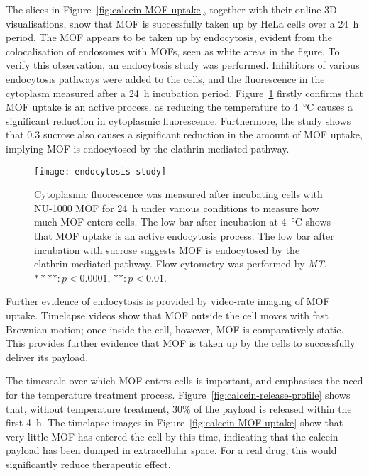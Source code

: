 The slices in Figure~\ref{fig:calcein-MOF-uptake}, together with their online 3D visualisations, show that MOF is successfully taken up by HeLa cells over a \SI{24}{\hour} period. 
The MOF appears to be taken up by endocytosis, evident from the colocalisation of endosomes with MOFs, seen as white areas in the figure. 
To verify this observation, an endocytosis study was performed.
Inhibitors of various endocytosis pathways were added to the cells, and the fluorescence in the cytoplasm measured after a \SI{24}{\hour} incubation period. 
Figure~\ref{fig:endocytosis-study} firstly confirms that MOF uptake is an active process, as reducing the temperature to \SI{4}{\degreeCelsius} causes a significant reduction in cytoplasmic fluorescence. 
Furthermore, the study shows that \SI{0.3}{\Molar} sucrose also causes a significant reduction in the amount of MOF uptake, implying MOF is endocytosed by the clathrin-mediated pathway. 

\begin{figure}[htbp!]
\centering
\texttt{[image: endocytosis-study]}
\caption[MOFs: An endocytosis study shows NU-1000 MOF is taken up by HeLa cells through the clathrin-mediated pathway]{Cytoplasmic fluorescence was measured after incubating cells with NU-1000 MOF for \SI{24}{\hour} under various conditions to measure how much MOF enters cells. The low bar after incubation at \SI{4}{\degreeCelsius} shows that MOF uptake is an active endocytosis process. The low bar after incubation with sucrose suggests MOF is endocytosed by the clathrin-mediated pathway. Flow cytometry was performed by \textit{MT}. $****: p<0.0001$, $**: p<0.01$. }
\label{fig:endocytosis-study}
\end{figure}

Further evidence of endocytosis is provided by video-rate imaging of MOF uptake.
Timelapse videos show that MOF outside the cell moves with fast Brownian motion; once inside the cell, however, MOF is comparatively static. 
This provides further evidence that MOF is taken up by the cells to successfully deliver its payload. 

The timescale over which MOF enters cells is important, and emphasises the need for the temperature treatment process. 
Figure~\ref{fig:calcein-release-profile} shows that, without temperature treatment, 30\% of the payload is released within the first \SI{4}{\hour}. 
The timelapse images in Figure~\ref{fig:calcein-MOF-uptake} show that very little MOF has entered the cell by this time, indicating that the calcein payload has been dumped in extracellular space. 
For a real drug, this would significantly reduce therapeutic effect. 


